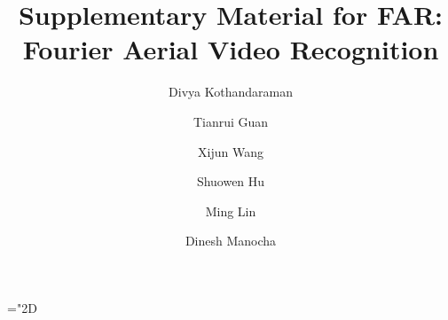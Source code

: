 \documentclass[runningheads]{llncs}
\begin{document}
\newcommand{\bigO}[1]{\mathcal{O}(#1)}
\newcommand{\sota}{state-of-the-art}
\newcommand{\tian}[1]{\textcolor{orange}{#1}}
\newcommand{\divya}[1]{\textcolor{blue}{#1}}
\newcommand{\model}{FAR}
\newcommand{\datanames}{Sub- matrices}
\newcommand{\G}{}
\newcommand{\V}{}
\newcommand{\E}{}
\newcommand{\brr}[1]{\left( #1 \right)}
\newcommand{\bcc}[1]{ \left{ #1 \right} }
\newcommand{\bss}[1]{\left[ #1 \right]}
\newcommand{\mc}[1]{\mathcal{#1}}
\newcommand{\sg}{\mathcal{L}}
\newcommand{\li}{\sg}
\newcommand{\vts}[1]{\lvert #1 \rvert}
\newcommand{\Vts}[1]{\lVert #1 \rVert}
\newcommand{\bb}[1]{\mathbb{#1}}
\newcommand\inv[1]{#1\raisebox{1.05ex}{}}
\newcommand\Tstrut{\rule{0pt}{2.6ex}}         \newcommand\Bstrut{\rule[-1.3ex]{0pt}{0pt}}   \newcommand\Bstrutfrac{\rule[-0.7ex]{0pt}{0pt}}   \newcommand\Tstrutfrac{\rule{0pt}{1.7ex}}         \newcommand\mathdash{\text{\normalfont --}}
\newcommand{\cost}{\bigO{ \vts{\li^{\scriptscriptstyle -1}_t}k }}
\newcommand{\cm}{\mathcal{M}_{\Delta t}(u)}
\newcommand{\pc}{\zeta_c(t)}
\newcommand{\pd}{\zeta_d(t)}
\newcommand{\pe}{\zeta_e(t)}
\newcommand{\costk}{\bigO{ \vts{\li^{\scriptscriptstyle -1}_t} }}
\newcommand\setrow[1]{\gdef\rowmac{#1}#1\ignorespaces}
\makeatletter
\newcommand\footnoteref[1]{\protected@xdef\@thefnmark{\ref{#1}}\@footnotemark}
\makeatother
\newcommand{\size}{\bigO{d}}
\newcommand{\shorteq}{\settowidth{\@tempdima}{-}\resizebox{\@tempdima}{\height}{=}}
\newcommand*\midpoint[1]{\overline{#1}}
\newcommand{\mysetminus}{\mathbin{\fgebackslash}}



\let\proof\relax
\let\endproof\relax

\linespread{0.97}
\setlength{\parskip}{-0.1em}
\mathchardef\mhyphen="2D

\newcommand{\minus}{\scalebox{0.75}[1.0]{}} 
\pagestyle{headings}
\mainmatter
\def\ECCVSubNumber{4270}  

\title{Supplementary Material for FAR: Fourier Aerial Video Recognition}

\begin{comment}
\titlerunning{ECCV-22 submission ID \ECCVSubNumber} 
\authorrunning{ECCV-22 submission ID \ECCVSubNumber} 
\author{Anonymous ECCV submission}
\institute{Paper ID \ECCVSubNumber}
\end{comment}


\author{Divya Kothandaraman \and
Tianrui Guan \and
Xijun Wang \and
Shuowen Hu \and
Ming Lin \and
Dinesh Manocha}
\maketitle
\end{document}
